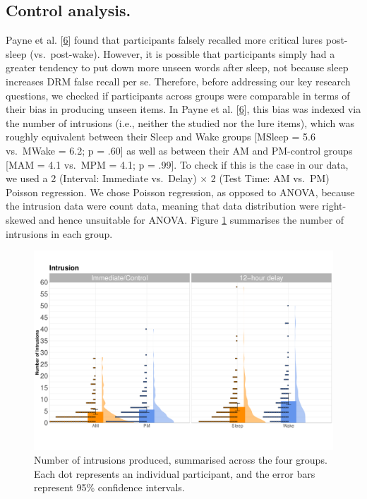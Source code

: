 \documentclass[
]{article}
\begin{document}
\hypertarget{control-analysis.}{%
\subsection{Control analysis.}\label{control-analysis.}}

Payne et al. {[}\protect\hyperlink{ref-payne2009a}{6}{]} found that participants falsely recalled more critical lures post-sleep (vs.~post-wake). However, it is possible that participants simply had a greater tendency to put down more unseen words after sleep, not because sleep increases DRM false recall per se. Therefore, before addressing our key research questions, we checked if participants across groups were comparable in terms of their bias in producing unseen items. In Payne et al. {[}\protect\hyperlink{ref-payne2009a}{6}{]}, this bias was indexed via the number of intrusions (i.e., neither the studied nor the lure items), which was roughly equivalent between their Sleep and Wake groups {[}MSleep = 5.6 vs.~MWake = 6.2; p = .60{]} as well as between their AM and PM-control groups {[}MAM = 4.1 vs.~MPM = 4.1; p = .99{]}. To check if this is the case in our data, we used a 2 (Interval: Immediate vs.~Delay) \(\times\) 2 (Test Time: AM vs.~PM) Poisson regression. We chose Poisson regression, as opposed to ANOVA, because the intrusion data were count data, meaning that data distribution were right-skewed and hence unsuitable for ANOVA. Figure \ref{fig:intrusionfig} summarises the number of intrusions in each group.

\begin{figure}

{\centering \includegraphics{Figures/intrusiongraph} 

}

\caption{Number of intrusions produced, summarised across the four groups. Each dot represents an individual participant, and the error bars represent 95\% confidence intervals.}\label{fig:intrusionfig}
\end{figure}
\end{document}
